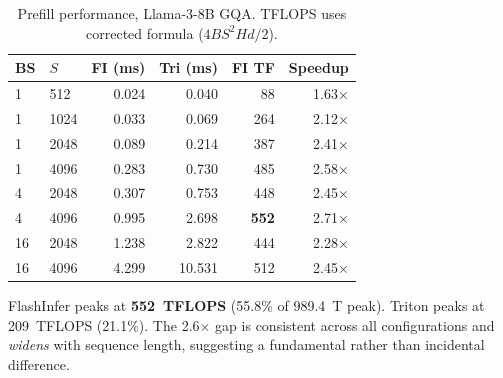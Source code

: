 \documentclass[10pt,twocolumn]{article}
\begin{document}
\begin{table}[h]
\centering
\small
\caption{Prefill performance, Llama-3-8B GQA.  TFLOPS uses corrected formula ($4 B S^2 H d / 2$).}
\label{tab:prefill}
\begin{tabular}{@{}llrrrr@{}}
\toprule
BS & $S$ & FI (ms) & Tri (ms) & FI TF & Speedup \\
\midrule
 1 &  512 & 0.024 & 0.040 &   88 & 1.63$\times$ \\
 1 & 1024 & 0.033 & 0.069 &  264 & 2.12$\times$ \\
 1 & 2048 & 0.089 & 0.214 &  387 & 2.41$\times$ \\
 1 & 4096 & 0.283 & 0.730 &  485 & 2.58$\times$ \\
 4 & 2048 & 0.307 & 0.753 &  448 & 2.45$\times$ \\
 4 & 4096 & 0.995 & 2.698 &  \textbf{552} & 2.71$\times$ \\
16 & 2048 & 1.238 & 2.822 &  444 & 2.28$\times$ \\
16 & 4096 & 4.299 &10.531 &  512 & 2.45$\times$ \\
\bottomrule
\end{tabular}
\end{table}

FlashInfer peaks at \textbf{552~TFLOPS} (55.8\% of 989.4~T peak).  Triton peaks at 209~TFLOPS (21.1\%).  The 2.6$\times$ gap is consistent across all configurations and \emph{widens} with sequence length, suggesting a fundamental rather than incidental difference.
\end{document}
